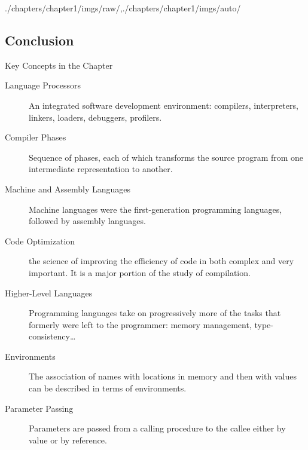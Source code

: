 \begin{graphicspathcontext}{{./chapters/chapter1/imgs/raw/},{./chapters/chapter1/imgs/auto/}}
\begin{bibunit}[apalike]
\section{Conclusion}
\sectiontableofcontentslide

\begin{frame}[t]{{Key Concepts} in the Chapter}
	\begin{description}
	\item[Language Processors] An integrated software development environment: compilers, interpreters, linkers, loaders, debuggers, profilers.
	\item[Compiler Phases] Sequence of phases, each of which transforms the source program from one intermediate representation to another.
	\item[Machine and Assembly Languages] Machine languages were the first-generation programming languages, followed by assembly languages.
	\item[Code Optimization] the science of improving the efficiency of code in both complex and very important. It is a major portion of the study of compilation.
	\item[Higher-Level Languages] Programming languages take on progressively more of the tasks that formerly were left to the programmer: memory management, type-consistency\dots
	\item[Environments] The association of names with locations in memory and then with values can be described in terms of environments.
	\item[Parameter Passing] Parameters are passed from a calling procedure to the callee either by value or by reference.
	\end{description}
\end{frame}


\end{bibunit}
\end{graphicspathcontext}
